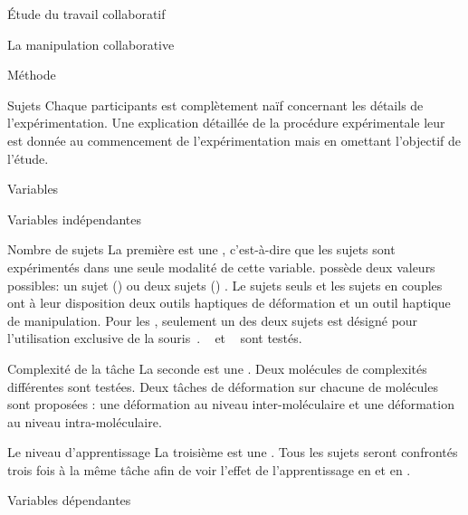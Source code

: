 \documentclass[myfrancais]{mythesis}
\begin{document}
\begin{mypart}{Étude du travail collaboratif}
\begin{mychapter}{La manipulation collaborative}
\begin{mysection}{Méthode}
\begin{mysubsection}{Sujets}
					Chaque participants est complètement naïf concernant les détails de l'expérimentation.
					Une explication détaillée de la procédure expérimentale leur est donnée au commencement de l'expérimentation mais en omettant l'objectif de l'étude.
				\end{mysubsection}
				\begin{mysubsection}{Variables}
					\begin{mysubsubsection}{Variables indépendantes}
						\begin{myparagraph}{ Nombre de sujets}
							La première  est une , c'est-à-dire que les sujets sont expérimentés dans une seule modalité de cette variable.
							 possède deux valeurs possibles: \og un sujet (\mycf {}) \fg ou \og deux sujets (\mycf {}) \fg.
							Le sujets seuls et les sujets en couples ont à leur disposition deux outils haptiques de déformation et un outil haptique de manipulation.
							Pour les , seulement un des deux sujets est désigné pour l'utilisation exclusive de la souris~\myThreeD.
							\mynum{12}~ et ~ sont testés.
						\end{myparagraph}
						\begin{myparagraph}{ Complexité de la tâche}
							La seconde  est une .
							Deux molécules de complexités différentes sont testées.
							Deux tâches de déformation sur chacune de molécules sont proposées : une déformation au niveau inter-moléculaire et une déformation au niveau intra-moléculaire.
						\end{myparagraph}
						\begin{myparagraph}{ Le niveau d'apprentissage}
							La troisième  est une .
							Tous les sujets seront confrontés trois fois à la même tâche afin de voir l'effet de l'apprentissage en  et en .
						\end{myparagraph}
					\end{mysubsubsection}
					\begin{mysubsubsection}{Variables dépendantes}

\end{mysubsubsection}
\end{mysubsection}
\end{mysection}
\end{mychapter}
\end{mypart}
\end{document}
